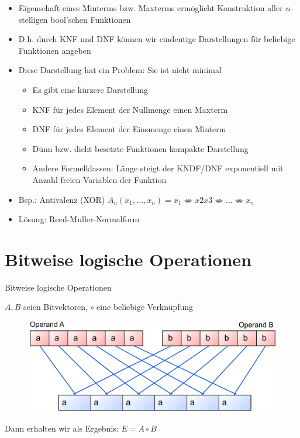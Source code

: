 \documentclass[12pt%
,aspectratio=169%
]{beamer}
\begin{document}
\begin{frame}{}
\begin{itemize}
	\item Eigenschaft eines Minterms bzw. Maxterms ermöglicht Konstruktion aller $n$-stelligen bool'schen Funktionen
	\item D.h. durch KNF und DNF können wir eindeutige Darstellungen für beliebige Funktionen angeben
	\item Diese Darstellung hat ein Problem: Sie ist nicht minimal
	\begin{itemize}
		\item Es gibt eine kürzere Darstellung
		\item KNF für jedes Element der Nullmenge einen Maxterm
		\item DNF für jedes Element der Einsmenge einen Minterm
		\item Dünn bzw. dicht besetzte Funktionen kompakte Darstellung
		\item Andere Formelklassen: Länge steigt der KNDF/DNF exponentiell mit Anzahl freien Variablen der Funktion
	\end{itemize}
	\item Bsp.: Antivalenz (XOR) $A_n(x_1 ,\ldots , x_n ) = x_1 \nLeftrightarrow x2  x3 \nLeftrightarrow \ldots \nLeftrightarrow x_n$
	\item Lösung: Reed-Muller-Normalform
\end{itemize}
\end{frame}

\section{Bitweise logische Operationen}
\begin{frame}{Bitweise logische Operationen}
\begin{center}
$A,B$ seien Bitvektoren, $\circ$ eine beliebige Verknüpfung
\begin{figure}
\includegraphics[scale=0.3]{pictures/bitvec}
\end{figure}
Dann erhalten wir als Ergebnis: $E = A \circ B$
\end{center}
\end{frame}
\end{document}
